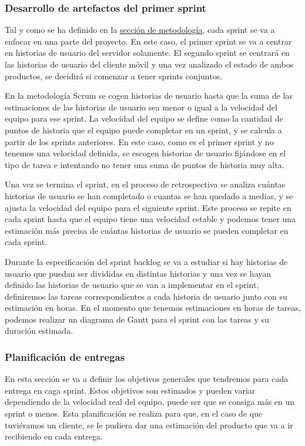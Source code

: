 \subsubsection{Desarrollo de artefactos del primer sprint}
Tal y como se ha definido en la \hyperref[sec:metodologia]{sección de metodología}, cada sprint se va a enfocar en una parte del proyecto. En este caso, el primer sprint se va a centrar en historias de usuario del servidor solamente. El segundo sprint se centrará en las historias de usuario del cliente móvil y una vez analizado el estado de ambos productos, se decidirá si comenzar a tener sprints conjuntos.

En la metodología Scrum se cogen historias de usuario hasta que la suma de las estimaciones de las historias de usuario sea menor o igual a la velocidad del equipo para ese sprint.
La velocidad del equipo se define como la cantidad de puntos de historia que el equipo puede completar en un sprint, y se calcula a partir de los sprints anteriores.
En este caso, como es el primer sprint y no tenemos una velocidad definida, se escogen historias de usuario fijándose en el tipo de tarea e intentando no tener una suma de puntos de historia muy alta.

Una vez se termina el sprint, en el proceso de retrospectiva se analiza cuántas historias de usuario se han completado o cuantas se han quedado a medias, y se ajusta la velocidad del equipo para el siguiente sprint. Este proceso se repite en cada sprint hasta que el equipo tiene una velocidad estable y podemos tener una estimación más precisa de cuántas historias de usuario se pueden completar en cada sprint.

Durante la especificación del sprint backlog se va a estudiar si hay historias de usuario que puedan ser divididas en distintas historias y una vez se hayan definido las historias de usuario que se van a implementar en el sprint, definiremos las tareas correspondientes a cada historia de usuario junto con su estimación en horas.
En el momento que tenemos estimaciones en horas de tareas, podemos realizar un diagrama de Gantt para el sprint con las tareas y su duración estimada.

\subsubsection{Planificación de entregas}
En esta sección se va a definir los objetivos generales que tendremos para cada entrega en caga sprint. Estos objetivos son estimados y pueden variar dependiendo de la velocidad real del equipo, puede ser que se consiga más en un sprint o menos. Esta planificación se realiza para que, en el caso de que tuviéramos un cliente, se le pudiera dar una estimación del producto que va a ir recibiendo en cada entrega.

